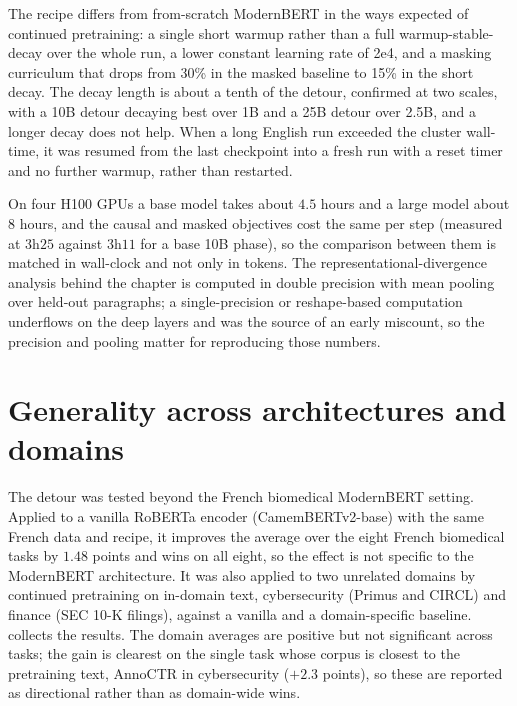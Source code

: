 The recipe differs from from-scratch ModernBERT in the ways expected of continued
pretraining: a single short warmup rather than a full warmup-stable-decay over the
whole run, a lower constant learning rate of 2e\text{-}4, and a masking curriculum
that drops from 30\% in the masked baseline to 15\% in the short decay. The decay
length is about a tenth of the detour, confirmed at two scales, with a 10B detour
decaying best over 1B and a 25B detour over 2.5B, and a longer decay does not help.
When a long English run exceeded the cluster wall-time, it was resumed from the last
checkpoint into a fresh run with a reset timer and no further warmup, rather than
restarted.

On four H100 GPUs a base model takes about $4.5$ hours and a large model about
$8$ hours, and the causal and masked objectives cost the same per step (measured at
$3$h$25$ against $3$h$11$ for a base 10B phase), so the comparison between them is
matched in wall-clock and not only in tokens. The representational-divergence
analysis behind the chapter is computed in double precision with mean pooling over
held-out paragraphs; a single-precision or reshape-based computation underflows on
the deep layers and was the source of an early miscount, so the precision and pooling
matter for reproducing those numbers.

\section{Generality across architectures and domains}

The detour was tested beyond the French biomedical ModernBERT setting. Applied to a
vanilla RoBERTa encoder (CamemBERTv2-base) with the same French data and recipe, it
improves the average over the eight French biomedical tasks by $1.48$ points and wins
on all eight, so the effect is not specific to the ModernBERT architecture. It was
also applied to two unrelated domains by continued pretraining on in-domain text,
cybersecurity (Primus and CIRCL) and finance (SEC 10-K filings), against a vanilla and
a domain-specific baseline.  collects the results. The domain
averages are positive but not significant across tasks; the gain is clearest on the
single task whose corpus is closest to the pretraining text, AnnoCTR in cybersecurity
($+2.3$ points), so these are reported as directional rather than as domain-wide wins.

